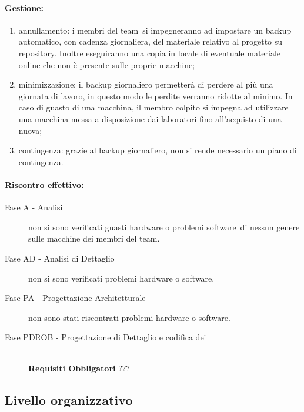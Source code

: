 \documentclass[../PianoProgetto.tex]{subfiles}
\begin{document}
	\paragraph*{Gestione:}
	\begin{enumerate}
		\item annullamento: i membri del team\g\ si impegneranno ad impostare un backup automatico, con cadenza giornaliera, del materiale relativo al progetto su repository\g . Inoltre eseguiranno una copia in locale di eventuale materiale online che non è presente sulle proprie macchine;
		\item minimizzazione: il backup giornaliero permetterà di perdere al più una giornata di lavoro, in questo modo le perdite verranno ridotte al minimo. In caso di guasto di una macchina, il membro colpito si impegna ad utilizzare una macchina messa a disposizione dai laboratori fino all'acquisto di una nuova;
		\item contingenza: grazie al backup giornaliero, non si rende necessario un piano di contingenza.
	\end{enumerate} 	
	
	
	\paragraph*{Riscontro effettivo:}
		\begin{description}
			\item[Fase A - Analisi] non si sono verificati guasti hardware o problemi software\g\ di nessun genere sulle macchine dei membri del team\g .
			\item[Fase AD - Analisi di Dettaglio] non si sono verificati problemi hardware o software\g.
			\item[Fase PA - Progettazione Architetturale] non sono stati riscontrati problemi hardware o software\g.
			\item[Fase PDROB - Progettazione di Dettaglio e codifica dei]  \ \\
					\textbf{Requisiti Obbligatori} ???
		\end{description}

\newpage
\subsection{Livello organizzativo}
\end{document}
